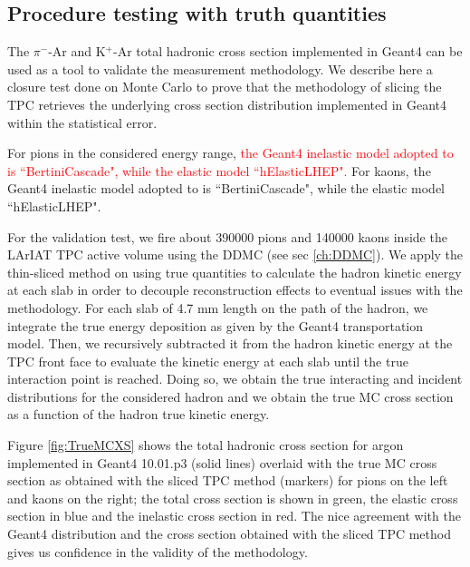 {\subsection{Procedure testing with truth quantities}
The $\pi^{-}$-Ar and K$^{+}$-Ar total hadronic cross section implemented in Geant4 can be used as a tool to validate the measurement methodology.  We describe here a closure test done on Monte Carlo to prove that the methodology of slicing the TPC retrieves the underlying cross section distribution implemented in Geant4 within the statistical error. %

For pions in the considered energy range, \textcolor{red}{the Geant4 inelastic model adopted to is ``BertiniCascade", while the elastic model ``hElasticLHEP".}
For kaons, the Geant4 inelastic model adopted to is ``BertiniCascade", while the elastic model ``hElasticLHEP".  


For the validation test, we fire about 390000 pions and 140000 kaons inside the LArIAT TPC active volume using the DDMC (see sec \ref{ch:DDMC}). We apply  the thin-sliced method on using true quantities to calculate the hadron kinetic energy at each slab in order to decouple reconstruction effects to eventual issues with the methodology.  For each slab of 4.7 mm length on the path of the hadron, we integrate the true energy deposition as given by the Geant4 transportation model. Then, we recursively subtracted it from the hadron kinetic energy at the TPC front face to evaluate the kinetic energy at each slab until the true interaction point is reached. Doing so, we obtain the true interacting and incident distributions for the considered hadron and we obtain the true MC cross section as a function of the hadron true kinetic energy. 

Figure \ref{fig:TrueMCXS} shows the total hadronic cross section for argon implemented in Geant4 10.01.p3 (solid lines) overlaid with the true MC cross section as obtained with the sliced TPC method (markers) for pions on the left and kaons on the right; the total cross section is shown in green,  the elastic cross section in blue and the inelastic cross section in red.  The nice agreement with the Geant4 distribution and the cross section  obtained with the sliced TPC method gives us confidence in the  validity of the methodology. 
        
}
